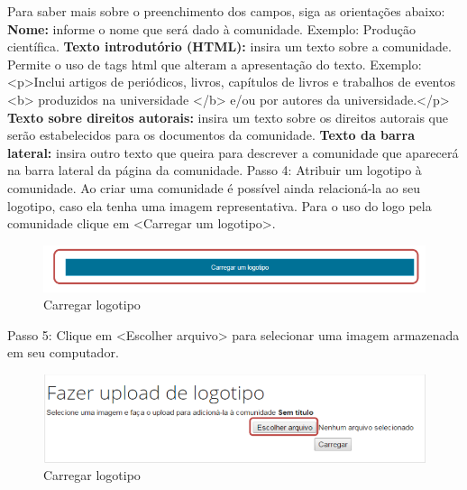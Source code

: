 \documentclass[12pt,hidelinks]{article}
\begin{document}
\newpage
    Para saber mais sobre o preenchimento dos campos, siga as orientações abaixo:
    \singlespacing
    \textbullet \hspace{6pt} \textbf{Nome:} informe o nome que será dado à comunidade. Exemplo: Produção científica.
    \singlespacing
    \textbullet \hspace{6pt} \textbf{Texto introdutório (HTML):} insira um texto sobre a comunidade. Permite o uso de tags html que alteram a apresentação do texto. Exemplo: <p>Inclui artigos de periódicos, livros, capítulos de livros e trabalhos de eventos <b> produzidos na universidade </b> e/ou por autores da universidade.</p>
    \singlespacing
    \textbullet \hspace{6pt} \textbf{Texto sobre direitos autorais:} insira um texto sobre os direitos autorais que serão estabelecidos para os documentos da comunidade.
    \singlespacing
    \textbullet \hspace{6pt} \textbf{Texto da barra lateral:}  insira outro texto que queira para descrever a comunidade que aparecerá na barra lateral da página da comunidade.
    \singlespacing
    Passo 4: Atribuir um logotipo à comunidade. Ao criar uma comunidade é possível ainda relacioná-la ao seu logotipo, caso ela tenha uma imagem representativa. Para o uso do logo pela comunidade clique em <Carregar um logotipo>.
    
    \begin{figure}[!htp]
                \centering
                \includegraphics[scale=0.8]{figura/Figura13.png}
                \caption{Carregar logotipo}
            \label{Rotulo}
        \end{figure}
        
    Passo 5: Clique em <Escolher arquivo> para selecionar uma imagem armazenada em seu computador. 
    
    \begin{figure}[!htp]
                \centering
                \includegraphics[scale=0.8]{figura/Figura14.png}
                \caption{Carregar logotipo}
            \label{Rotulo}
        \end{figure}
        
\end{document}
